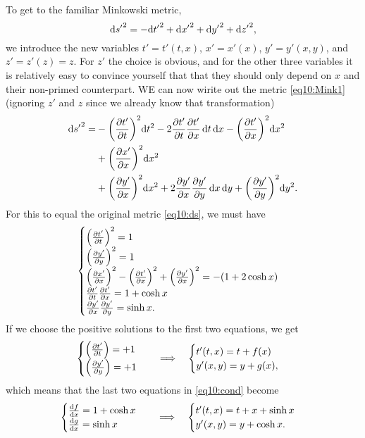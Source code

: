 \documentclass[11pt,a4paper, 
swedish, english %
]{article}
\begin{document}
To get to the familiar Minkowski metric,
\begin{equation}\label{eq10:Mink1}
\mathrm{d}{s'}^2=-\mathrm{d}{t'}^2+\mathrm{d}{x'}^2+\mathrm{d}{y'}^2+\mathrm{d}{z'}^2,
\end{equation}
we introduce the new variables $t'=t'(t,x)$, $x'=x'(x)$, $y'=y'(x,y)$,
and $z'=z'(z)=z$. For $z'$ the choice is obvious, and for the other
three variables it is relatively easy to convince yourself that that
they should only depend on $x$ and their non-primed counterpart. WE
can now wirite out the metric \eqref{eq10:Mink1} (ignoring $z'$ and
$z$ since we already know that transformation)
\begin{equation}%
\begin{aligned}
\rd{s'}^2=&
-\qty(\pdv{t'}{t})^2\rd{t}^2-2\pdv{t'}{t}\pdv{t'}{x}\id{t}\id{x}
-\qty(\pdv{t'}{x})^2\rd{x}^2\\
&+\qty(\pdv{x'}{x})^2\rd{x}^2\\
&+\qty(\pdv{y'}{x})^2\rd{x}^2+2\pdv{y'}{x}\pdv{y'}{y}\id{x}\id{y}
+\qty(\pdv{y'}{y})^2\rd{y}^2.
\end{aligned}
\end{equation}
For this to equal the original metric \eqref{eq10:ds}, we must have
\begin{equation}\label{eq10:cond}
\begin{cases}
\qty(\pdv{t'}{t})^2=1\\
\qty(\pdv{y'}{y})^2=1\\
\qty(\pdv{x'}{x})^2-\qty(\pdv{t'}{x})^2+\qty(\pdv{y'}{x})^2
=-(1+2\cosh x)\\
\pdv{t'}{t}\pdv{t'}{x}=1+\cosh x\\
\pdv{y'}{x}\pdv{y'}{y}=\sinh x.
\end{cases}
\end{equation}
If we choose the positive solutions to the first two equations, we get
\begin{equation}
\begin{cases}
\qty(\pdv{t'}{t})=+1\\
\qty(\pdv{y'}{y})=+1\\
\end{cases}
\quad\Longrightarrow\quad
\begin{cases}
t'(t,x)=t+f(x)\\
y'(x,y)=y+g(x),
\end{cases}
\end{equation}
which means that the last two equations in \eqref{eq10:cond} become
\begin{equation}
\begin{cases}
\dv{f}{x}=1+\cosh x\\
\dv{g}{x}=\sinh x
\end{cases}
\quad\Longrightarrow\quad
\begin{cases}
t'(t,x)=t+x+\sinh x\\
y'(x,y)=y+\cosh x.
\end{cases}
\end{equation}
\end{document}
